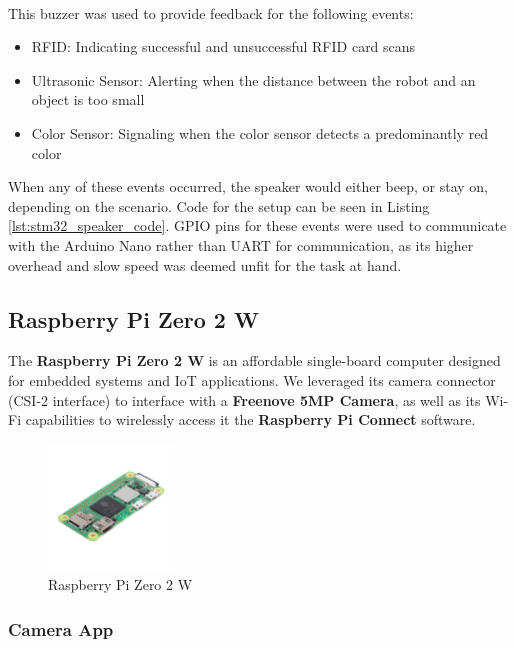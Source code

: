 \documentclass{article}
\begin{document}
\

This buzzer was used to provide feedback for the following events:
\begin{itemize}
    \item RFID: Indicating successful and unsuccessful RFID card scans
    \item Ultrasonic Sensor: Alerting when the distance between the robot and an object is too small
    \item Color Sensor: Signaling when the color sensor detects a predominantly red color
\end{itemize}

When any of these events occurred, the speaker would either beep, or stay on, depending on the scenario. Code for the setup can be seen in Listing \ref{lst:stm32_speaker_code}. GPIO pins for these events were used to communicate with the Arduino Nano rather than UART for communication, as its higher overhead
and slow speed was deemed unfit for the task at hand.

\subsection{Raspberry Pi Zero 2 W}

The \textbf{Raspberry Pi Zero 2 W} is an affordable single-board computer designed for
embedded systems and IoT applications. We leveraged its camera connector (CSI-2 interface)
to interface with a \textbf{Freenove 5MP Camera}, as well as its Wi-Fi capabilities to
wirelessly access it the \textbf{Raspberry Pi Connect} software.

\begin{figure}[H]
    \centering
    \includegraphics[width=0.3\textwidth]{Figures/PiZero_2.jpg}
    \caption{Raspberry Pi Zero 2 W}
    \label{fig:raspberrypi}
\end{figure}

\subsubsection{Camera App}
\end{document}
